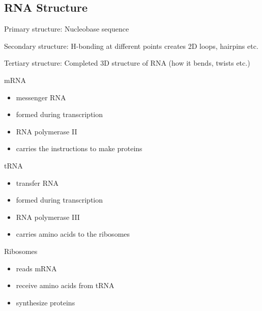 \documentclass[11pt,fleqn]{book} %
\begin{document}
\subsection{RNA Structure}
\begin{descriptions}
    \item[Primary structure:] Nucleobase sequence 
    \item[Secondary structure:] H-bonding at different points creates 2D loops, hairpins etc.
    \item[Tertiary structure:] Completed 3D structure of RNA (how it bends, twists etc.)
    \item[mRNA] 
    \begin{itemize}
        \item messenger RNA
        \item formed during transcription
        \item RNA polymerase II
        \item carries the instructions to make proteins
    \end{itemize}
    \item[tRNA]
    \begin{itemize}
        \item transfer RNA
        \item formed during transcription
        \item RNA polymerase III
        \item carries amino acids to the ribosomes
    \end{itemize}
    \item[Ribosomes]
    \begin{itemize}
        \item reads mRNA
        \item receive amino acids from tRNA
        \item synthesize proteins
    \end{itemize}
\end{descriptions} 
\end{document}
